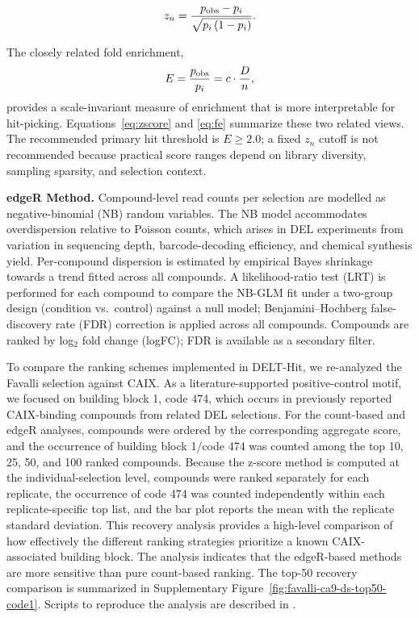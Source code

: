 \documentclass[pdflatex,sn-nature]{sn-jnl}
\begin{document}
\begin{equation}
z_n = \frac{p_{\rm obs} - p_i}{\sqrt{p_i\,(1 - p_i)}}.
\label{eq:zscore}
\end{equation}

The closely related fold enrichment,
\begin{equation}
E = \frac{p_{\rm obs}}{p_i} = c \cdot \frac{D}{n},
\label{eq:fe}
\end{equation}
provides a scale-invariant measure of enrichment that is more interpretable for
hit-picking. Equations~\ref{eq:zscore} and \ref{eq:fe} summarize these two
related views. The recommended primary hit threshold is $E \geq 2.0$; a fixed
$z_n$ cutoff is not recommended because practical score ranges depend on
library diversity, sampling sparsity, and selection context.

\textbf{edgeR Method.}
Compound-level read counts per selection are modelled as negative-binomial
(NB) random variables. The NB model accommodates overdispersion relative to
Poisson counts, which arises in DEL experiments from variation in sequencing
depth, barcode-decoding efficiency, and chemical synthesis yield. Per-compound
dispersion is estimated by empirical Bayes shrinkage towards a trend fitted
across all compounds\cite{robinson_edgerbioconductorpackage_2010}. A likelihood-ratio test (LRT) is performed
for each compound to compare the NB-GLM fit under a two-group design
(condition vs.\ control) against a null model; Benjamini--Hochberg
false-discovery rate (FDR) correction is applied across all compounds.
Compounds are ranked by log$_2$ fold change (logFC); FDR is available as a
secondary filter.

\label{supp:enrichment-scores-comparison}

To compare the ranking schemes implemented in DELT-Hit, we re-analyzed the Favalli selection against CAIX. As a
literature-supported positive-control motif, we focused on building block 1, code 474, which occurs in previously
reported CAIX-binding compounds from related DEL selections\cite{bassi_singlestrandeddnaencodedchemical_2020,favalli_stereoregiodefineddnaencoded_2021}. For the count-based and edgeR analyses, compounds were ordered by the corresponding aggregate score, and the occurrence of building block 1/code 474 was counted among the top 10, 25, 50, and 100 ranked compounds. Because the z-score method is computed at the individual-selection level, compounds were ranked separately for each replicate, the occurrence of code 474 was counted independently within each replicate-specific top list, and the bar plot reports the mean with the replicate standard deviation. This recovery analysis provides a high-level comparison of how effectively the different ranking strategies prioritize a known CAIX-associated building block. The analysis indicates that the edgeR-based methods are more sensitive than pure count-based ranking. The top-50 recovery comparison is summarized in Supplementary Figure~\ref{fig:favalli-ca9-ds-top50-code1}. Scripts to reproduce the analysis are described in .
\end{document}
